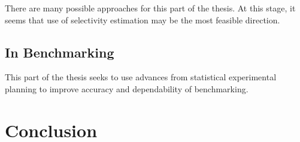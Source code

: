 \documentclass{llncs}
\begin{document}
There are many possible approaches for this part of the thesis. At
this stage, it seems that use of selectivity estimation may be the
most feasible direction.

\subsection{In Benchmarking}

This part of the thesis seeks to use advances from statistical
experimental planning to improve accuracy and dependability of benchmarking.

\section{Conclusion}
\end{document}
